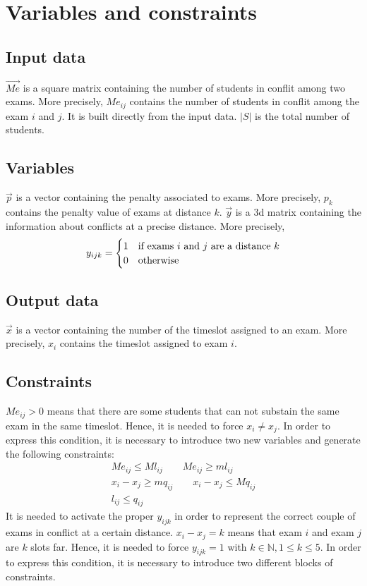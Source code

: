 \section*{Variables and constraints}
\subsection*{Input data}
$ \vec{Me} $ is a square matrix containing the number of students in conflit among two exams. More precisely, $ Me_{ij} $ contains the number of students in conflit among the exam $i$ and $j$. It is built directly from the input data.
\newline
$ |S| $ is the total number of students.

\subsection*{Variables}
$ \vec{p} $ is a vector containing the penalty associated to exams. More precisely, $ p_{k} $ contains the penalty value of exams at distance $k$.
\newline
$ \vec{y} $ is a 3d matrix containing the information about conflicts at a precise distance. More precisely, 
\[
y_{ijk} = 
\begin{cases}
1	&	\text{if exams $ i $ and $ j $ are a distance $ k $}	\\
0	&	\text{otherwise}
\end{cases}
\]

\subsection*{Output data}
$ \vec{x} $ is a vector containing the number of the timeslot assigned to an exam. More precisely, $ x_{i} $ contains the timeslot assigned to exam $i$.

\subsection*{Constraints}
$ Me_{ij} > 0 $ means that there are some students that can not substain the same exam in the same timeslot. Hence, it is needed to force $ x_{i} \ne x_{j} $.
In order to express this condition, it is necessary to introduce two new variables and generate the following constraints:
\begin{gather*}
Me_{ij} \le M l_{ij} \qquad Me_{ij} \ge m l_{ij} \\
x_{i} - x_{j} \ge m q_{ij} \qquad x_{i} - x_{j} \le M q_{ij} \\
l_{ij} \le q_{ij}
\end{gather*}
\newline
It is needed to activate the proper $ y_{ijk} $ in order to represent the correct couple of exams in conflict at a certain distance.
\newline
$ x_{i} - x_{j} = k $ means that exam $i$ and exam $j$ are $k$ slots far. Hence, it is needed to force $ y_{ijk} = 1 $ with $ k \in \mathbb{N}, 1 \le k \le 5 $.
In order to express this condition, it is necessary to introduce two different blocks of constraints.

